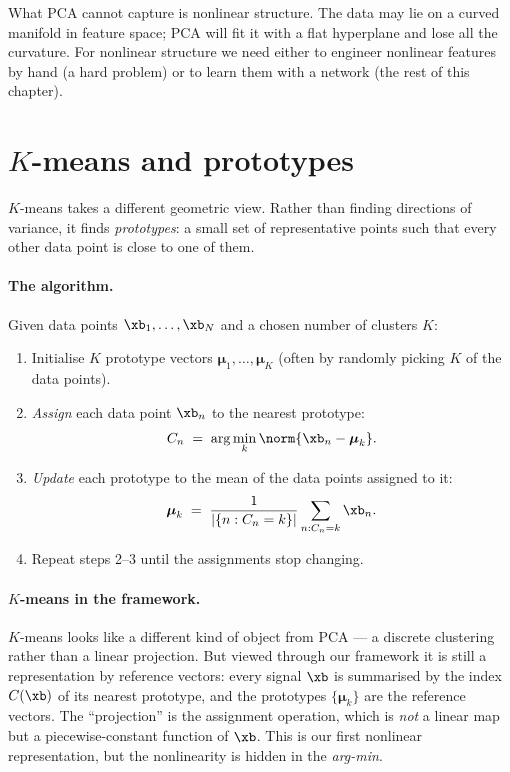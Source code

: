 What PCA cannot capture is nonlinear structure.  The data may lie on
a curved manifold in feature space; PCA will fit it with a flat
hyperplane and lose all the curvature.  For nonlinear structure we
need either to engineer nonlinear features by hand (a hard problem) or
to learn them with a network (the rest of this chapter).

\section{$K$-means and prototypes}
\label{sec:kmeans}

$K$-means takes a different geometric view.  Rather than finding
directions of variance, it finds \emph{prototypes}: a small set of
representative points such that every other data point is close to one
of them.

\paragraph{The algorithm.}  Given data points $\xb_1, \ldots, \xb_N$
and a chosen number of clusters $K$:

\begin{enumerate}
    \item Initialise $K$ prototype vectors $\boldsymbol\mu_1, \ldots,
    \boldsymbol\mu_K$ (often by randomly picking $K$ of the data
    points).

    \item \emph{Assign} each data point $\xb_n$ to the nearest
    prototype:
    \[
        C_n \;=\; \arg\min_k \norm{\xb_n - \boldsymbol\mu_k}.
    \]

    \item \emph{Update} each prototype to the mean of the data points
    assigned to it:
    \[
        \boldsymbol\mu_k \;=\; \frac{1}{|\{n : C_n = k\}|}
        \sum_{n : C_n = k} \xb_n.
    \]

    \item Repeat steps 2--3 until the assignments stop changing.
\end{enumerate}

\paragraph{$K$-means in the framework.}  $K$-means looks like a
different kind of object from PCA --- a discrete clustering rather than
a linear projection.  But viewed through our framework it is still a
representation by reference vectors: every signal $\xb$ is summarised
by the index $C(\xb)$ of its nearest prototype, and the prototypes
$\{\boldsymbol\mu_k\}$ are the reference vectors.  The ``projection''
is the assignment operation, which is \emph{not} a linear map but a
piecewise-constant function of $\xb$.  This is our first nonlinear
representation, but the nonlinearity is hidden in the
\emph{arg-min}.

